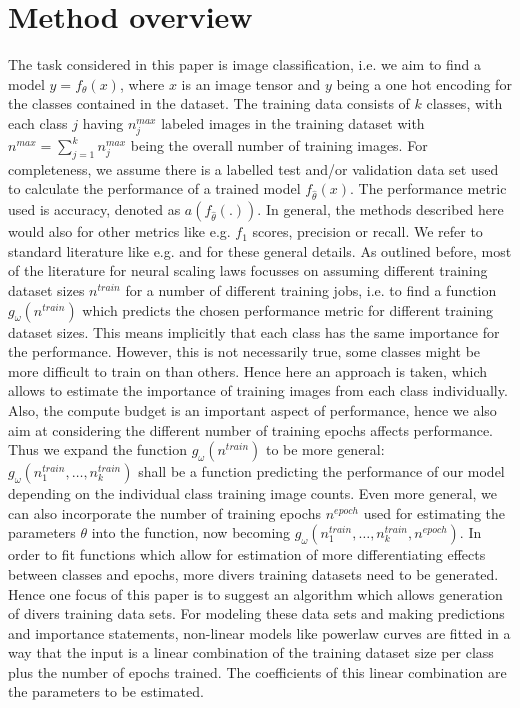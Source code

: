 \documentclass{article} %
\begin{document}
\section{Method overview}

The task considered in this paper is image classification, i.e. we aim to find a model $y = f_{\theta}(x)$, where $x$ is an image tensor and $y$ being a one hot encoding for the classes contained in the dataset.
The training data consists of $k$ classes, with each class $j$ having $n_j^{max}$ labeled images in the training dataset with $n^{max} = \sum_{j= 1}^k n_j^{max}$ being the overall number of training images.
For completeness, we assume there is a labelled test and/or validation data set used to calculate the performance of a trained model $f_{\hat{\theta}}(x)$.
The performance metric used is accuracy, denoted as $a(f_{\hat{\theta}}(.))$. In general, the methods described here would also for other metrics like e.g. $f_1$ scores, precision or recall.
We refer to standard literature like e.g. \cite{Goodfellowetal2016} and \cite{Bishop2006PatternRecog} for these general details.
As outlined before, most of the literature for neural scaling laws focusses on assuming different training dataset sizes $n^{train}$ for a number of different training jobs, i.e. to find a function $g_{\omega}(n^{train})$ which predicts the chosen performance metric for different training dataset sizes.
This means implicitly that each class has the same importance for the performance.
However, this is not necessarily true, some classes might be more difficult to train on than others.
Hence here an approach is taken, which allows to estimate the importance of training images from each class individually.
Also, the compute budget is an important aspect of performance, hence we also aim at considering the different number of training epochs affects performance.
Thus we expand the function $g_{\omega}(n^{train})$ to be more general: $g_{\omega}(n_1^{train}, \dots, n_k^{train})$ shall be a function predicting the performance of our model depending on the individual class training image counts.
Even more general, we can also incorporate the number of training epochs $n^{epoch}$ used for estimating the parameters $\theta$ into the function, now becoming $g_{\omega}(n_1^{train}, \dots, n_k^{train}, n^{epoch})$.
In order to fit functions which allow for estimation of more differentiating effects between classes and epochs, more divers training datasets need to be generated.
Hence one focus of this paper is to suggest an algorithm which allows generation of divers training data sets.
For modeling these data sets and making predictions and importance statements, non-linear models like powerlaw curves are fitted in a way that the input is a linear combination of the training dataset size per class plus the number of epochs trained.
The coefficients of this linear combination are the parameters to be estimated.
\end{document}
